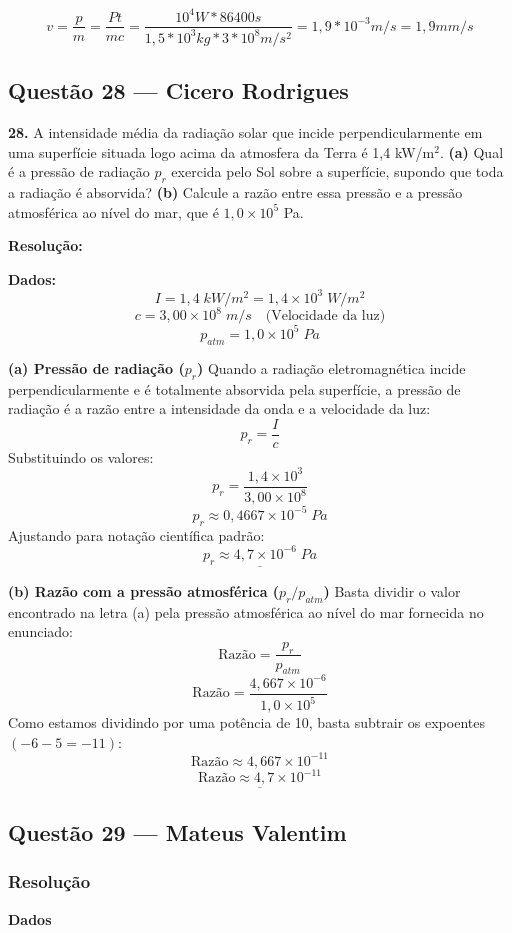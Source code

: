 \documentclass[12pt,a4paper]{article}
\begin{document}
\[
v = \frac{p}{m} = \frac{Pt}{mc} = \frac{10^4W*86400s}{1,5*10^3 kg*3*10^8 m/s^2} = 1,9*10^{-3} m/s = 1,9 mm/s
\]

\subsection{Questão 28 — Cicero Rodrigues}

\textbf{28. }\normalfont A intensidade média da radiação solar que incide perpendicularmente em uma superfície situada logo acima da atmosfera da Terra é 1,4 kW/m$^2$. \textbf{(a)} Qual é a pressão de radiação $p_r$ exercida pelo Sol sobre a superfície, supondo que toda a radiação é absorvida? \textbf{(b)} Calcule a razão entre essa pressão e a pressão atmosférica ao nível do mar, que é $1,0 \times 10^5$ Pa.

\textbf{Resolução:}
\vspace{0.3cm}

\textbf{Dados:}
\[I = 1,4\;kW/m^2 = 1,4 \times 10^3\;W/m^2\]
\[c = 3,00 \times 10^8\;m/s \quad \text{(Velocidade da luz)}\]
\[p_{atm} = 1,0 \times 10^5\;Pa\]

\vspace{0.2cm}
\textbf{(a) Pressão de radiação (\(p_r\))}
Quando a radiação eletromagnética incide perpendicularmente e é totalmente absorvida pela superfície, a pressão de radiação é a razão entre a intensidade da onda e a velocidade da luz:
\[p_r = \frac{I}{c}\]
Substituindo os valores:
\[p_r = \frac{1,4 \times 10^3}{3,00 \times 10^8}\]
\[p_r \approx 0,4667 \times 10^{-5}\;Pa\]
Ajustando para notação científica padrão:
\[\underline{p_r \approx 4,7 \times 10^{-6}\;Pa}\]

\vspace{0.2cm}
\textbf{(b) Razão com a pressão atmosférica (\(p_r / p_{atm}\))}
Basta dividir o valor encontrado na letra (a) pela pressão atmosférica ao nível do mar fornecida no enunciado:
\[\text{Razão} = \frac{p_r}{p_{atm}}\]
\[\text{Razão} = \frac{4,667 \times 10^{-6}}{1,0 \times 10^5}\]
Como estamos dividindo por uma potência de 10, basta subtrair os expoentes \((-6 - 5 = -11)\):
\[\text{Razão} \approx 4,667 \times 10^{-11}\]
\[\underline{\text{Razão} \approx 4,7 \times 10^{-11}}\]

\subsection{Questão 29 — Mateus Valentim}
\subsubsection{Resolução}
\textbf{Dados}
\end{document}
